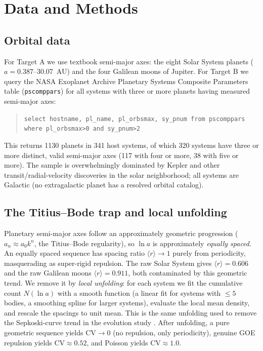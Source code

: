 \documentclass[12pt,a4paper]{article}
\begin{document}
\section{Data and Methods}

\subsection{Orbital data}

For Target A we use textbook semi-major axes: the eight Solar System planets ($a=0.387$--30.07~AU) and the four Galilean moons of Jupiter. For Target B we query the NASA Exoplanet Archive Planetary Systems Composite Parameters table (\texttt{pscomppars}) for all systems with three or more planets having measured semi-major axes:
\begin{quote}\footnotesize
\texttt{select hostname, pl\_name, pl\_orbsmax, sy\_pnum from pscomppars where pl\_orbsmax>0 and sy\_pnum>2}
\end{quote}
This returns 1130 planets in 341 host systems, of which 320 systems have three or more distinct, valid semi-major axes (117 with four or more, 38 with five or more). The sample is overwhelmingly dominated by Kepler and other transit/radial-velocity discoveries in the solar neighborhood; all systems are Galactic (no extragalactic planet has a resolved orbital catalog).

\subsection{The Titius--Bode trap and local unfolding}

Planetary semi-major axes follow an approximately geometric progression ($a_{n}\approx a_0 k^n$, the Titius--Bode regularity), so $\ln a$ is approximately \emph{equally spaced}. An equally spaced sequence has spacing ratio $\langle r\rangle\to1$ purely from periodicity, masquerading as super-rigid repulsion. The raw Solar System gives $\langle r\rangle=0.606$ and the raw Galilean moons $\langle r\rangle=0.911$, both contaminated by this geometric trend. We remove it by \emph{local unfolding}: for each system we fit the cumulative count $N(\ln a)$ with a smooth function (a linear fit for systems with $\le5$ bodies, a smoothing spline for larger systems), evaluate the local mean density, and rescale the spacings to unit mean. This is the same unfolding used to remove the Sepkoski-curve trend in the evolution study \citep{chen2026evo}. After unfolding, a pure geometric sequence yields $\mathrm{CV}\to0$ (no repulsion, only periodicity), genuine GOE repulsion yields $\mathrm{CV}\approx0.52$, and Poisson yields $\mathrm{CV}\approx1.0$.
\end{document}
